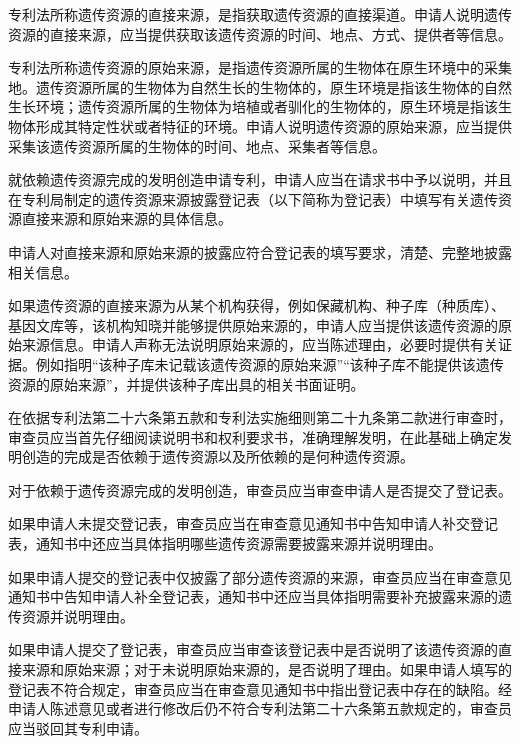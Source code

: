 专利法所称遗传资源的直接来源，是指获取遗传资源的直接渠道。申请人说明遗传资源的直接来源，应当提供获取该遗传资源的时间、地点、方式、提供者等信息。

专利法所称遗传资源的原始来源，是指遗传资源所属的生物体在原生环境中的采集地。遗传资源所属的生物体为自然生长的生物体的，原生环境是指该生物体的自然生长环境；遗传资源所属的生物体为培植或者驯化的生物体的，原生环境是指该生物体形成其特定性状或者特征的环境。申请人说明遗传资源的原始来源，应当提供采集该遗传资源所属的生物体的时间、地点、采集者等信息。

就依赖遗传资源完成的发明创造申请专利，申请人应当在请求书中予以说明，并且在专利局制定的遗传资源来源披露登记表（以下简称为登记表）中填写有关遗传资源直接来源和原始来源的具体信息。

申请人对直接来源和原始来源的披露应符合登记表的填写要求，清楚、完整地披露相关信息。

如果遗传资源的直接来源为从某个机构获得，例如保藏机构、种子库（种质库）、基因文库等，该机构知晓并能够提供原始来源的，申请人应当提供该遗传资源的原始来源信息。申请人声称无法说明原始来源的，应当陈述理由，必要时提供有关证据。例如指明“该种子库未记载该遗传资源的原始来源”“该种子库不能提供该遗传资源的原始来源”，并提供该种子库出具的相关书面证明。

在依据专利法第二十六条第五款和专利法实施细则第二十九条第二款进行审查时，审查员应当首先仔细阅读说明书和权利要求书，准确理解发明，在此基础上确定发明创造的完成是否依赖于遗传资源以及所依赖的是何种遗传资源。

对于依赖于遗传资源完成的发明创造，审查员应当审查申请人是否提交了登记表。

如果申请人未提交登记表，审查员应当在审查意见通知书中告知申请人补交登记表，通知书中还应当具体指明哪些遗传资源需要披露来源并说明理由。

如果申请人提交的登记表中仅披露了部分遗传资源的来源，审查员应当在审查意见通知书中告知申请人补全登记表，通知书中还应当具体指明需要补充披露来源的遗传资源并说明理由。

如果申请人提交了登记表，审查员应当审查该登记表中是否说明了该遗传资源的直接来源和原始来源；对于未说明原始来源的，是否说明了理由。如果申请人填写的登记表不符合规定，审查员应当在审查意见通知书中指出登记表中存在的缺陷。经申请人陈述意见或者进行修改后仍不符合专利法第二十六条第五款规定的，审查员应当驳回其专利申请。

